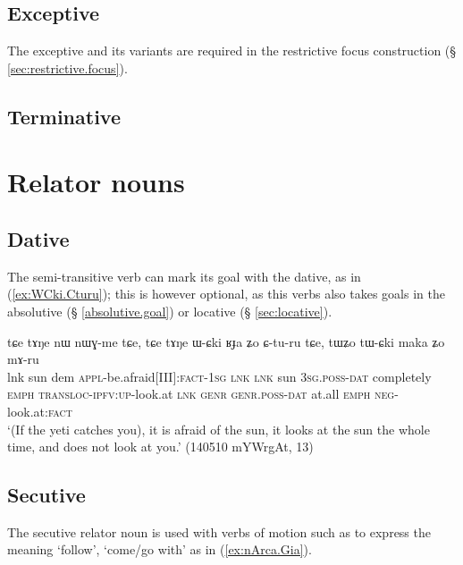 \subsection{Exceptive} \label{sec:exceptive} %

The exceptive  and its variants are required in the restrictive focus construction (§ \ref{sec:restrictive.focus}).

\subsection{Terminative} \label{sec:terminative}  %


\section{Relator nouns}  \label{sec:relator.nouns}  
\subsection{Dative} \label{sec:dative} 

The semi-transitive verb  can mark its goal with the dative, as in (\ref{ex:WCki.Cturu}); this is however optional, as this verbs also takes goals in the absolutive (§ \ref{absolutive.goal}) or locative (§ \ref{sec:locative}).

\begin{exe}
\ex \label{ex:WCki.Cturu}
\gll tɕe tɤŋe nɯ nɯɣ-me tɕe, tɕe tɤŋe ɯ-ɕki ʁɟa ʑo ɕ-tu-ru tɕe, tɯʑo tɯ-ɕki maka ʑo mɤ-ru \\
lnk sun dem \textsc{appl}-be.afraid[III]:\textsc{fact}-\textsc{1sg} \textsc{lnk} \textsc{lnk} sun \textsc{3sg}.\textsc{poss}-\textsc{dat} completely \textsc{emph} \textsc{transloc}-\textsc{ipfv}:\textsc{up}-look.at \textsc{lnk} \textsc{genr} \textsc{genr}.\textsc{poss}-\textsc{dat} at.all \textsc{emph} \textsc{neg}-look.at:\textsc{fact} \\
\glt `(If the yeti catches you), it is afraid of the sun, it looks at the sun the whole time, and does not look at you.' (140510 mYWrgAt, 13)
\end{exe}

\subsection{Secutive} \label{sec:secutive} 
The secutive relator noun  is used with verbs of motion such as  to express the meaning `follow', `come/go with' as in (\ref{ex:nArca.Gia}).

